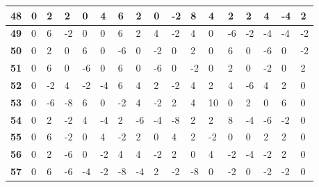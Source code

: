 \begin{longtable}[c]{|l|l|l|l|l|l|l|l|l|l|l|l|l|l|l|l|l|}
\textbf{48} & 0          & 2          & 2          & 0          & 4          & 6          & 2          & 0          & -2         & 8          & 4           & 2           & 2           & 4           & -4          & 2           \\ \hline
\textbf{49} & 0          & 6          & -2         & 0          & 0          & 6          & 2          & 4          & -2         & 4          & 0           & -6          & -2          & -4          & -4          & -2          \\ \hline
\textbf{50} & 0          & 2          & 0          & 6          & 0          & -6         & 0          & -2         & 0          & 2          & 0           & 6           & 0           & -6          & 0           & -2          \\ \hline
\textbf{51} & 0          & 6          & 0          & -6         & 0          & 6          & 0          & -6         & 0          & -2         & 0           & 2           & 0           & -2          & 0           & 2           \\ \hline
\textbf{52} & 0          & -2         & 4          & -2         & -4         & 6          & 4          & 2          & -2         & 4          & 2           & 4           & -6          & 4           & 2           & 0           \\ \hline
\textbf{53} & 0          & -6         & -8         & 6          & 0          & -2         & 4          & -2         & 2          & 4          & 10          & 0           & 2           & 0           & 6           & 0           \\ \hline
\textbf{54} & 0          & 2          & -2         & 4          & -4         & 2          & -6         & -4         & -8         & 2          & 2           & 8           & -4          & -6          & -2          & 0           \\ \hline
\textbf{55} & 0          & 6          & -2         & 0          & 4          & -2         & 2          & 0          & 4          & 2          & -2          & 0           & 0           & 2           & 2           & 0           \\ \hline
\textbf{56} & 0          & 2          & -6         & 0          & -2         & 4          & 4          & -2         & 2          & 0          & 4           & -2          & -4          & -2          & 2           & 0           \\ \hline
\textbf{57} & 0          & 6          & -6         & -4         & -2         & -8         & -4         & 2          & -2         & -8         & 0           & -2          & 0           & -2          & -2          & 0           \\ \hline

\end{longtable}
